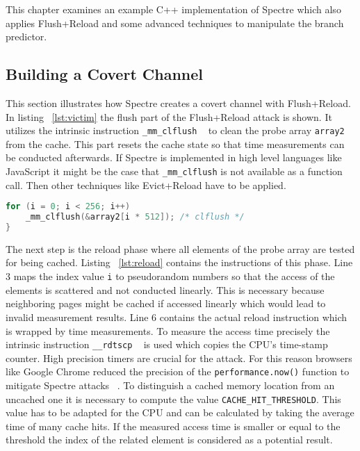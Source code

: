 \documentclass[a4paper,oneside,openright] {scrreprt}
\begin{document}
This chapter examines an example C++ implementation of Spectre which also applies Flush+Reload and some advanced techniques
to manipulate the branch predictor.

\subsection{Building a Covert Channel}
\label{ch:intro:motivation:A}
 
This section illustrates how Spectre creates a covert channel with Flush+Reload. 
In listing ~\ref{lst:victim} the flush part of the Flush+Reload attack is shown. It utilizes the intrinsic instruction 
\texttt{\_mm\_clflush} ~\cite{intelintrinsics} to clean the probe array \texttt{array2} from the cache. This part resets the cache state
so that time measurements can be conducted afterwards. If Spectre is implemented in high level languages like JavaScript it
might be the case that \texttt{\_mm\_clflush} is not available as a function call. Then other techniques like Evict+Reload have
to be applied.

\begin{lstlisting}[language=C, caption=Spectre: Flush, label={lst:flush}]
for (i = 0; i < 256; i++)
    _mm_clflush(&array2[i * 512]); /* clflush */
}
\end{lstlisting}

The next step is the reload phase where all elements of the probe array are tested for being cached. 
Listing ~\ref{lst:reload} contains the instructions of this phase. Line 3 maps the index value \texttt{i} to pseudorandom numbers
 so that the access of the elements is scattered and not conducted linearly. 
 This is necessary because neighboring pages might be cached if 
accessed linearly which would lead to invalid measurement results. Line 6 contains the actual reload instruction which is wrapped 
by time measurements.
To measure the access time precisely the intrinsic instruction \texttt{\_\_rdtscp} ~\cite{intelintrinsics} is used which
copies the CPU's time-stamp counter. High precision timers are crucial for the attack. For this reason browsers like 
Google Chrome reduced the precision of the \texttt{performance.now()} function to mitigate Spectre attacks ~\cite{chromeSpectreMeltdown}.
To distinguish a cached memory location from an uncached one it is necessary to compute the value \texttt{CACHE\_HIT\_THRESHOLD}.
This value has to be adapted for the CPU and can be calculated by taking the average time of many cache hits.
If the measured access time is smaller or equal to the threshold the index of the related element is considered as a potential result.
\end{document}
